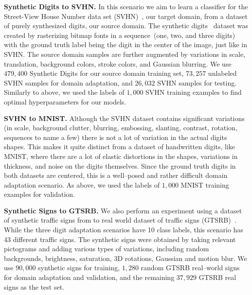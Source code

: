 \documentclass{article}
\begin{document}
\textbf{Synthetic Digits to SVHN.}  In this scenario we aim to learn a classifier for the Street-View House Number data set (SVHN)~\cite{netzer2011reading}, our target domain, from a dataset of purely synthesized digits, our source domain. The synthetic digits~\cite{ganin2016domain} dataset was created by rasterizing bitmap fonts in a sequence~(one, two, and three digits) with the ground truth label being the digit in the center of the image, just like in SVHN. The source domain samples are further augmented by variations in scale, translation, background colors, stroke colors, and Gaussian blurring. We use $479,400$ Synthetic Digits for our source domain training set, $73,257$ unlabeled SVHN samples for domain adaptation, and $26,032$ SVHN samples for testing.  Similarly to above, we used the labels of $1,000$ SVHN training examples to find optimal hyperparameters for our models. 

\textbf{SVHN to MNIST.}  Although the SVHN dataset contains significant variations (in scale, background clutter, blurring, embossing, slanting, contrast, rotation, sequences to name a few) there is not a lot of variation in the actual digits shapes. This makes it quite distinct from a dataset of handwritten digits, like MNIST, where there are a lot of elastic distortions in the shapes, variations in thickness, and noise on the digits themselves. Since the ground truth digits in both datasets are centered, this is a well--posed and rather difficult domain adaptation scenario. As above, we used the labels of $1,000$ MNIST training examples for validation.

\textbf{Synthetic Signs to GTSRB.} We also perform an experiment using a dataset of synthetic traffic signs from \cite{Moiseev2013} to real world dataset of traffic signs (GTSRB)~\cite{stallkamp2012gtsrb}. While the three digit adaptation scenarios have 10 class labels, this scenario has 43 different traffic signs. The synthetic signs were obtained by taking relevant pictograms and adding various types of variations, including random backgrounds, brightness, saturation, 3D rotations, Gaussian and motion blur. We use $90,000$ synthetic signs for training, $1,280$ random GTSRB real--world signs for domain adaptation and validation, and the remaining $37,929$ GTSRB real signs as the test set.
\end{document}
